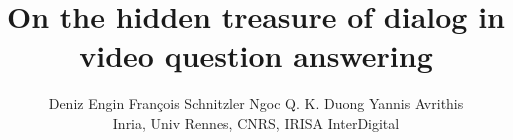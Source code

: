 \documentclass[10pt,twocolumn,letterpaper]{article}
\begin{document}
\title{On the hidden treasure of dialog in video question answering}

\author{Deniz Engin \qquad Fran{ç}ois Schnitzler \qquad Ngoc Q. K. Duong \qquad  Yannis Avrithis \\ 
Inria, Univ Rennes, CNRS, IRISA \qquad InterDigital}

\maketitle
\ificcvfinal\thispagestyle{empty}\fi



\newcommand{\head}[1]{{\smallskip\noindent\textbf{#1}}}
\newcommand{\alert}[1]{{\color{red}{#1}}}
\newcommand{\sm}{\scriptsize}
\newcommand{\eq}[1]{(\ref{eq:#1})}

\newcommand{\Th}[1]{\textsc{#1}}
\newcommand{\mr}[2]{\multirow{#1}{*}{#2}}
\newcommand{\mc}[2]{\multicolumn{#1}{c}{#2}}
\newcommand{\tb}[1]{\textbf{#1}}
\newcommand{\ch}{\checkmark}

\newcommand{\red}[1]{{\color{red}{#1}}}
\newcommand{\blue}[1]{{\color{blue}{#1}}}
\newcommand{\green}[1]{{\color{green}{#1}}}
\newcommand{\gray}[1]{{\color{gray}{#1}}}

\newcommand{\citeme}[1]{\red{[XX]}}
\newcommand{\refme}[1]{\red{(XX)}}

\newcommand{\fig}[2][1]{\texttt{[image: fig/\#2]}}
\newcommand{\figh}[2][1]{\texttt{[image: fig/\#2]}}



\newcommand{\tran}{^\top}
\newcommand{\mtran}{^{-\top}}
\newcommand{\zcol}{\mathbf{0}}
\newcommand{\zrow}{\zcol\tran}

\newcommand{\ind}{\mathbbm{1}}
\newcommand{\expect}{\mathbb{E}}
\newcommand{\nat}{\mathbb{N}}
\newcommand{\zahl}{\mathbb{Z}}
\newcommand{\real}{\mathbb{R}}
\newcommand{\proj}{\mathbb{P}}
\newcommand{\prob}{\mathbf{Pr}}
\newcommand{\normal}{\mathcal{N}}

\newcommand{\mif}{\textrm{if}\ }
\newcommand{\other}{\textrm{otherwise}}
\newcommand{\minimize}{\textrm{minimize}\ }
\newcommand{\maximize}{\textrm{maximize}\ }
\newcommand{\st}{\textrm{subject\ to}\ }

\newcommand{\id}{\operatorname{id}}
\newcommand{\const}{\operatorname{const}}
\newcommand{\sgn}{\operatorname{sgn}}
\newcommand{\var}{\operatorname{Var}}
\newcommand{\mean}{\operatorname{mean}}
\newcommand{\trace}{\operatorname{tr}}
\newcommand{\diag}{\operatorname{diag}}
\newcommand{\vect}{\operatorname{vec}}
\newcommand{\cov}{\operatorname{cov}}
\newcommand{\sign}{\operatorname{sign}}
\newcommand{\prj}{\operatorname{proj}}
\end{document}
